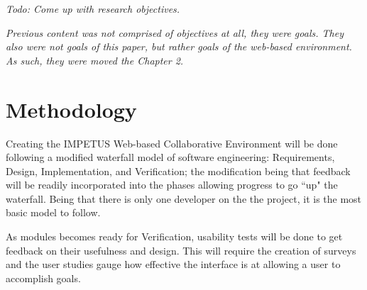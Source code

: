 \textit{Todo: Come up with research objectives.}

\textit{Previous content was not comprised of objectives at all, they were goals. They also were not goals of this paper, but rather goals of the web-based environment. As such, they were moved the Chapter 2.}

\section{Methodology}

Creating the IMPETUS Web-based Collaborative Environment will be done following a modified waterfall model of software engineering: Requirements, Design, Implementation, and Verification; the modification being that feedback will be readily incorporated into the phases allowing progress to go ``up" the waterfall. Being that there is only one developer on the the project, it is the most basic model to follow.

As modules becomes ready for Verification, usability tests will be done to get feedback on their usefulness and design. This will require the creation of surveys and the user studies gauge how effective the interface is at allowing a user to accomplish goals.
































